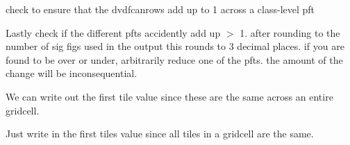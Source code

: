 check to ensure that the dvdfcanrow\textquotesingle{}s add up to 1 across a class-\/level pft

Lastly check if the different pfts accidently add up $>$ 1. after rounding to the number of sig figs used in the output this rounds to 3 decimal places. if you are found to be over or under, arbitrarily reduce one of the pfts. the amount of the change will be inconsequential.

We can write out the first tile value since these are the same across an entire gridcell.

Just write in the first tiles value since all tiles in a gridcell are the same. 